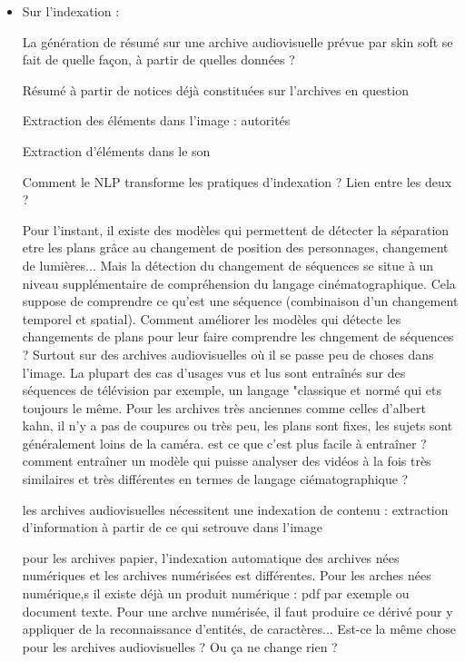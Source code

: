 \begin{itemize}
	Difficulté de paramétrer l’application en fonction de la manière de saisir les données propres à chaque institution, des thésaurus utilisés... 
	
	L'application et les paramétrages évoluent presque à chaque nouveau client et devient plus malléable.  
	
	
	
	\item Sur l’indexation :  
	
	La génération de résumé sur une archive audiovisuelle prévue par skin soft se fait de quelle façon, à partir de quelles données ? 
	
	Résumé à partir de notices déjà constituées sur l’archives en question 
	
	Extraction des éléments dans l’image : autorités 
	
	Extraction d’éléments dans le son 
	
	Comment le NLP transforme les pratiques d’indexation ? Lien entre les deux ? 
	
	Pour l'instant, il existe des modèles qui permettent de détecter la séparation etre les plans grâce au changement de position des personnages, changement de lumières...
	Mais la détection du changement de séquences se situe à un niveau supplémentaire de compréhension du langage cinématographique. Cela suppose de comprendre ce qu'est une séquence (combinaison d'un changement temporel et spatial). Comment améliorer les modèles qui détecte les changements de plans pour leur faire comprendre les chngement de séquences ? Surtout sur des archives audiovisuelles où il se passe peu de choses dans l'image. La plupart des cas d'usages vus et lus sont entraînés sur des séquences de télévision par exemple, un langage "classique et normé qui ets toujours le même. 
	Pour les archives très anciennes comme celles d'albert kahn, il n'y a pas de coupures ou très peu, les plans sont fixes, les sujets sont généralement loins de la caméra. est ce que c'est plus facile à entraîner ? comment entraîner un modèle qui puisse analyser des vidéos à la fois très similaires et très différentes en termes de langage ciématographique ?
	
	les archives audiovisuelles nécessitent une indexation de contenu : extraction d'information à partir de ce qui setrouve dans l'image
	
	pour les archives papier, l'indexation automatique des archives nées numériques et les archives numérisées est différentes. Pour les arches nées numérique,s il existe déjà un produit numérique : pdf par exemple ou document texte. Pour une archve numérisée, il faut produire ce dérivé pour y appliquer de la reconnaissance d'entités, de caractères... 
	Est-ce la même chose pour les archives audiovisuelles ? Ou ça ne change rien ? 
	

\end{itemize}
